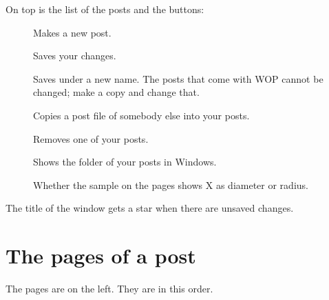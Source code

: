 
On top is the list of the posts and the buttons:
\begin{description}
\item[] Makes a new post.
\item[] Saves your changes.
\item[] Saves under a new name. The posts that come with WOP cannot be changed; make a copy and change that.
\item[] Copies a post file of somebody else into your posts.
\item[] Removes one of your posts.
\item[] Shows the folder of your posts in Windows.
\item[] Whether the sample on the pages shows X as diameter or radius.
\end{description}
The title of the window gets a star when there are unsaved changes.

\section{The pages of a post}\label{sec:posts:pages}
The pages are on the left. They are in this order.

